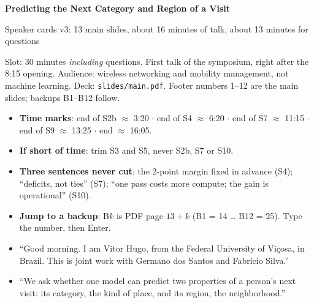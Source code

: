 {\Large\bfseries Predicting the Next Category and Region of a Visit}\par
\smallskip
{\large Speaker cards v3: 13 main slides, about 16 minutes of talk, about 13 minutes for questions}\par
\smallskip
Slot: 30 minutes \emph{including} questions. First talk of the symposium, right after the 8:15
opening. Audience: wireless networking and mobility management, not machine learning.
Deck: \texttt{slides/main.pdf}. Footer numbers 1--12 are the main slides; backups B1--B12 follow.

\medskip
\begin{itemize}
  \item \textbf{Time marks}: end of S2b $\approx$ 3:20 $\cdot$ end of S4 $\approx$ 6:20 $\cdot$ end of S7
        $\approx$ 11:15 $\cdot$ end of S9 $\approx$ 13:25 $\cdot$ end $\approx$ 16:05.
  \item \textbf{If short of time}: trim S3 and S5, never S2b, S7 or S10.
  \item \textbf{Three sentences never cut}: the 2-point margin fixed in advance (S4); ``deficits, not
        ties'' (S7); ``one pass costs more compute; the gain is operational'' (S10).
  \item \textbf{Jump to a backup}: B$k$ is PDF page $13+k$ (B1 = 14 \dots{} B12 = 25). Type the
        number, then Enter.
\end{itemize}

\say
\begin{itemize}
  \item ``Good morning. I am Vitor Hugo, from the Federal University of Viçosa, in Brazil. This is
        joint work with Germano dos Santos and Fabrício Silva.''
  \item ``We ask whether one model can predict two properties of a person's next visit: its category,
        the kind of place, and its region, the neighborhood.''
\end{itemize}


